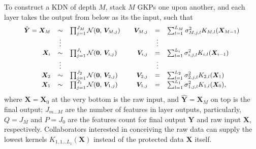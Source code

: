 \documentclass[11pt]{article}
\newcommand{\bs}{\boldsymbol}
\newcommand{\xv}{\boldsymbol{V}}
\newcommand{\xx}{\boldsymbol{X}}
\newcommand{\xy}{\boldsymbol{Y}}
\newcommand{\xyh}{\hat{\xy}}
\begin{document}
To construct a KDN of depth $M$, stack $M$ GKPs one upon another, and each layer takes the output from below as its the input, such that
\begin{equation} \label{eq:kdn}
  \begin{small} 
    \begin{array}{rclrcl}
      \xyh = 
      \xx_{M  } & \sim   & \prod_{j=1}^{J_{M  }} \mathcal{N}(\bs{0}, \, \xv_{M,j}) \quad & \xv_{M, j} & =      & \sum_{l=1}^{L_{M  }} \sigma_{M, j, l}^2 K_{M,l}(\xx_{M-1}) \\
                & \vdots &                                                         \quad &            & \vdots & \\
      \xx_{i  } & \sim   & \prod_{j=1}^{J_{i  }} \mathcal{N}(\bs{0}, \, \xv_{i,j}) \quad & \xv_{i, j} & =      & \sum_{l=1}^{L_{i  }} \sigma_{i, j, l}^2 K_{i,l}(\xx_{i-1}) \\
                & \vdots &                                                         \quad &            & \vdots & \\
      \xx_{2  } & \sim   & \prod_{j=1}^{J_{2  }} \mathcal{N}(\bs{0}, \, \xv_{2,j}) \quad & \xv_{2, j} & =      & \sum_{l=1}^{L_{2  }} \sigma_{2, j, l}^2 K_{2,l}(\xx_{1  }) \\
      \xx_{1  } & \sim   & \prod_{j=1}^{J_{1  }} \mathcal{N}(\bs{0}, \, \xv_{1,j}) \quad & \xv_{1, j} & =      & \sum_{l=1}^{L_{1  }} \sigma_{1, j, l}^2 K_{1,l}(\xx_{0  }),
    \end{array}
  \end{small}
\end{equation}
where $\xx=\xx_0$ at the very bottom is the raw input, and $\hat{\xy} = \xx_M$ on top is the final output; $J_{m \dots M}$ are the number of features in layer outputs, particularly, $Q = J_M$ and $P = J_0$ are the features count for final output $\xy$ and raw input $\xx$, respectively. Collaborators interested in conceiving the raw data can supply the lowest kernels $K_{1, 1 \dots L_1}(\xx)$ instead of the protected data $\xx$ itself.
\end{document}
